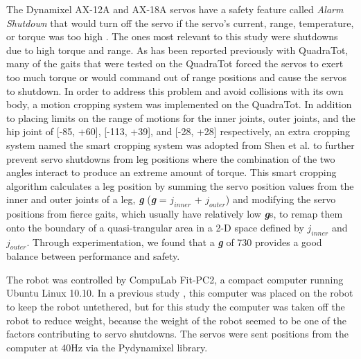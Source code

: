 The Dynamixel AX-12A and AX-18A servos have a safety feature called \emph{Alarm Shutdown} that would turn off the servo if the servo's current, range, temperature, or torque was too high \cite{robotis}. 
The ones most relevant to this study were shutdowns due to high torque and range. 
As has been reported previously with QuadraTot\cite{yos:clune}, many of the gaits that were tested on the QuadraTot forced the servos to exert too much torque or would command out of range positions and cause the servos to shutdown. In order to address this problem and avoid collisions with its own body, a motion cropping system was implemented on the QuadraTot. 
In addition to placing limits on the range of motions for the inner joints, outer joints, and the hip joint of [-85\degree, +60\degree], [-113\degree, +39\degree], and [-28\degree, +28\degree] respectively, an extra cropping system named the smart cropping system was adopted from Shen et al. \cite{haocheng} to further prevent servo shutdowns from leg positions where the combination of the two angles interact to produce an extreme amount of torque. This smart cropping algorithm calculates a leg position by summing the servo position values from the inner and outer joints of a leg, \emph{\textbf{g}} (\emph{\textbf{g}} = $j_{inner}$ + $j_{outer}$) %
and modifying the servo positions from fierce gaits, which usually have relatively low \emph{\textbf{g}}s, to remap them onto the boundary of a quasi-trangular area in a 2-D space defined by $j_{inner}$ and $j_{outer}$. %
Through experimentation, we found that a \emph{\textbf{g}} of 730 provides a good balance between performance and safety. %


The robot was controlled by CompuLab Fit-PC2, a compact computer running Ubuntu Linux 10.10. 
In a previous study \cite{yos:clune}, this computer was placed on the robot to keep the robot untethered, but for this study the computer was taken off the robot to reduce weight, because the weight of the robot seemed to be one of the factors contributing to servo shutdowns.
The servos were sent positions from the computer at 40Hz via the Pydynamixel library. 


